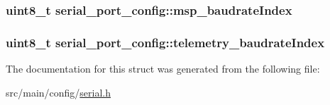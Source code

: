 \hypertarget{structserial__port__config_addc2400b5518f2fc7891f35e6cb324e4}{
\subsubsection[{msp\+\_\+baudrate\+Index}]{\setlength{\rightskip}{0pt plus 5cm}uint8\+\_\+t serial\+\_\+port\+\_\+config\+::msp\+\_\+baudrate\+Index}}\label{structserial__port__config_addc2400b5518f2fc7891f35e6cb324e4}
\hypertarget{structserial__port__config_a4d5942832f483bb9dc069a11143e43f1}{
\subsubsection[{telemetry\+\_\+baudrate\+Index}]{\setlength{\rightskip}{0pt plus 5cm}uint8\+\_\+t serial\+\_\+port\+\_\+config\+::telemetry\+\_\+baudrate\+Index}}\label{structserial__port__config_a4d5942832f483bb9dc069a11143e43f1}


The documentation for this struct was generated from the following file\+:\begin{DoxyCompactItemize}
\item 
src/main/config/\hyperlink{config_2serial_8h}{serial.\+h}\end{DoxyCompactItemize}
